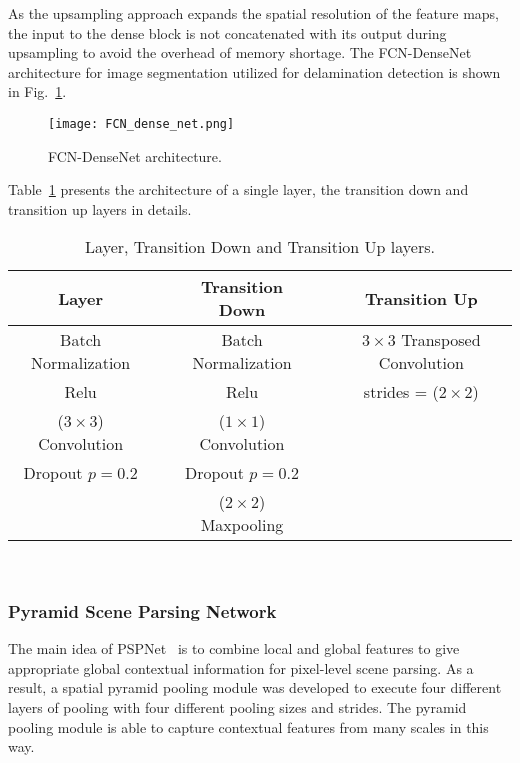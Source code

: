 As the upsampling approach expands the spatial resolution of the feature maps, the input to the dense block is not concatenated with its output during upsampling to avoid the overhead of memory shortage.
The FCN-DenseNet architecture for image segmentation utilized for delamination detection is shown in Fig.~\ref{fcn}.
\begin{figure} [h!]
	\begin{center}
		\texttt{[image: FCN\_dense\_net.png]}
	\end{center}
	\caption{FCN-DenseNet architecture.} 
	\label{fcn}
\end{figure}
Table~\ref{layers} presents the architecture of a single layer, the transition down and transition up layers in details.
\begin{table}[h!]
	\renewcommand{\arraystretch}{1.3}
	\centering
	\scriptsize
	\resizebox{\textwidth}{!}
	{
		\begin{tabular}{ccccc}
			\hline
			Layer & & Transition Down & & Transition Up \\ 
			\hline
			Batch Normalization & & Batch Normalization & & \(3\times 3\) Transposed Convolution \\ 
			Relu & & Relu & & strides = (\(2\times2\)) \\ 
			(\(3\times3\)) Convolution & & (\(1\times1\)) Convolution & & \\ 
			Dropout \(p=0.2\) & &Dropout \(p=0.2\) & & \\ 
			& & (\(2\times2\)) Maxpooling & & \\ 
			\hline
		\end{tabular}
	}
	\caption{Layer, Transition Down and Transition Up layers.} 
	\label{layers}	
\end{table}\\
\subsubsection{Pyramid Scene Parsing Network}
The main idea of PSPNet~\cite{zhao2017pyramid} is to combine local and global features to give appropriate global contextual information for pixel-level scene parsing.
As a result, a spatial pyramid pooling module was developed to execute four different layers of pooling with four different pooling sizes and strides.
The pyramid pooling module is able to capture contextual features from many scales in this way.

